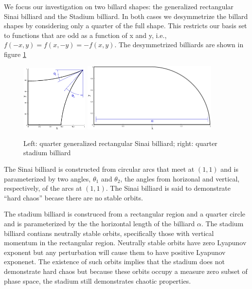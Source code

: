 \documentclass{report}
\begin{document}
We focus our investigation on two billard shapes: the generalized rectangular Sinai billiard and the Stadium billiard. In both cases we desymmetrize the billard shapes by considering only a quarter of the full shape. This restricts our basis set to functions that are odd as a function of x and y, i.e., $f(-x,y) = f(x,-y) = -f(x,y)$. The desymmetrized billiards are shown in figure \ref{fig:billiards}

\begin{figure}
  \begin{center}
    \includegraphics[width=0.3\textwidth]{figs/domains/qugrs_fig.eps}
    \includegraphics[width=0.6\textwidth]{figs/domains/qust_fig.eps}
    \caption{Left: quarter generalized rectangular Sinai billiard; right: quarter stadium billiard}
    \label{fig:billiards}
  \end{center}
\end{figure}

The Sinai billiard is constructed from circular arcs that meet at $(1,1)$ and is parameterized by two angles, $\theta_{1}$ and $\theta_{2}$, the angles from horizonal and vertical, respectively, of the arcs at $(1,1)$. The Sinai billiard is said to demonstrate ``hard chaos'' becase there are no stable orbits.

The stadium billiard is construced from a rectangular region and a quarter circle and is parameterized by the the horizontal length of the billiard $\alpha$. The stadium billiard contians neutrally stable orbits, specifically those with vertical momentum in the rectangular region. Neutrally stable orbits have zero Lyapunov exponent but any perturbation will cause them to have positive Lyapunov exponenet. The existence of such orbits implies that the stadium does not demonstrate hard chaos but because these orbits occupy a measure zero subset of phase space, the stadium still demonstrates chaotic properties.
\end{document}
